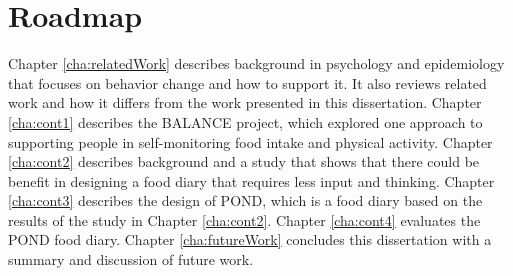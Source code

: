 \section{Roadmap}
Chapter \ref{cha:relatedWork} describes background in psychology and epidemiology that focuses on behavior change and how to support it. It also reviews related work and how it differs from the work presented in this dissertation.  Chapter \ref{cha:cont1} describes the BALANCE project, which explored one approach to supporting people in self-monitoring food intake and physical activity. Chapter \ref{cha:cont2} describes background and a study that shows that there could be benefit in designing a food diary that requires less input and thinking. Chapter \ref{cha:cont3} describes the design of POND, which is a food diary based on the results of the study in Chapter \ref{cha:cont2}. Chapter \ref{cha:cont4} evaluates the POND food diary. Chapter \ref{cha:futureWork} concludes this dissertation with a summary and discussion of future work. 
